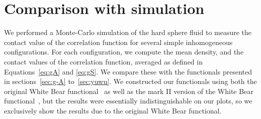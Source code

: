 



\section{Comparison with simulation}\label{sec:comparison}

We performed a Monte-Carlo simulation of the hard sphere fluid to
measure the contact value of the correlation function for several
simple inhomogeneous configurations.  For each configuration, we
compute the mean density, and the contact values of the correlation
function, averaged as defined in Equations~\ref{eq:gA} and
\ref{eq:gS}.  We compare these with the functionals presented in
sections~\ref{sec:g-A} to~\ref{sec:yuwu}.  We constructed our
functionals using both the original White Bear
functional~\cite{roth2002whitebear} as well as the mark II version of
the White Bear functional~\cite{hansen2006density}, but the results
were essentially indistinguishable on our plots, so we exclusively
show the results due to the original White Bear functional.

